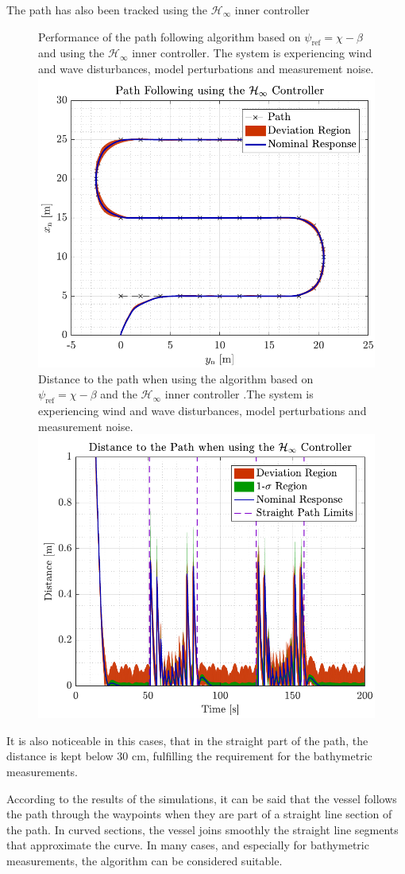 The path has also been tracked using the $\mathcal{H}_\infty$ inner controller 
\begin{figure}[H]
    \captionbox 
    {   
        Performance of the path following algorithm based on $\psi_\mathrm{ref}=\chi-\beta$ and using the $\mathcal{H}_\infty$ inner controller. The system is experiencing wind and wave disturbances, model perturbations and measurement noise. \label{fig:path_rob2}
    }                                                                 
    {                                                                  
        \includegraphics[width=.45\textwidth]{figures/path_rob}         
    }                                                                    
    \hspace{5pt}                                                          
    \captionbox  
    {      
        Distance to the path when using the algorithm based on $\psi_\mathrm{ref}=\chi-\beta$ and the $\mathcal{H}_\infty$ inner controller .The system is experiencing wind and wave disturbances, model perturbations and measurement noise.\label{fig:dist_rob2}
    }                                                                          
    {
        \includegraphics[width=.45\textwidth]{figures/dist_rob}
    }
\end{figure}
It is also noticeable in this cases, that in the straight part of the path, the distance is kept below 30 cm, fulfilling the requirement for the bathymetric measurements.

According to the results of the simulations, it can be said that the vessel follows the path through the waypoints when they are part of a straight line section of the path. In curved sections, the vessel joins smoothly the straight line segments that approximate the curve. In many cases, and especially for bathymetric measurements, the algorithm can be considered suitable.


